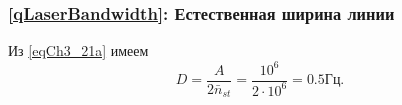 \chapter{}

\section{}

\subsection{\ref{qLaserBandwidth}: Естественная ширина линии}
Из \eqref{eqCh3_21a}
имеем
\[
D = \frac{A}{2 \bar{n}_{st}} = \frac{10^6}{2 \cdot 10^6} = 0.5 \mbox{Гц.}
\]

